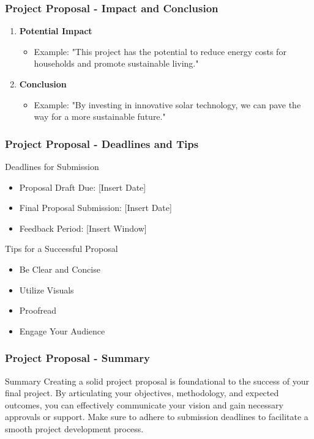 \documentclass{beamer}
\begin{document}
\begin{frame}[fragile]
    \frametitle{Project Proposal - Impact and Conclusion}
    \begin{enumerate}[resume]
        \item \textbf{Potential Impact}
            \begin{itemize}
                \item Example: "This project has the potential to reduce energy costs for households and promote sustainable living."
            \end{itemize}
        \item \textbf{Conclusion}
            \begin{itemize}
                \item Example: "By investing in innovative solar technology, we can pave the way for a more sustainable future."
            \end{itemize}
    \end{enumerate}
\end{frame}

\begin{frame}[fragile]
    \frametitle{Project Proposal - Deadlines and Tips}
    \begin{block}{Deadlines for Submission}
        \begin{itemize}
            \item Proposal Draft Due: [Insert Date]
            \item Final Proposal Submission: [Insert Date]
            \item Feedback Period: [Insert Window]
        \end{itemize}
    \end{block}

    \begin{block}{Tips for a Successful Proposal}
        \begin{itemize}
            \item Be Clear and Concise
            \item Utilize Visuals
            \item Proofread
            \item Engage Your Audience
        \end{itemize}
    \end{block}
\end{frame}

\begin{frame}[fragile]
    \frametitle{Project Proposal - Summary}
    \begin{block}{Summary}
        Creating a solid project proposal is foundational to the success of your final project. By articulating your objectives, methodology, and expected outcomes, you can effectively communicate your vision and gain necessary approvals or support. Make sure to adhere to submission deadlines to facilitate a smooth project development process.
    \end{block}
\end{frame}
\end{document}
